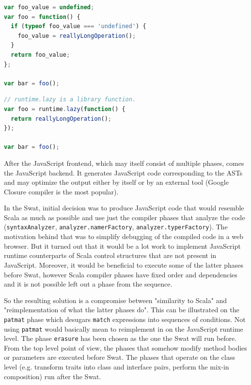 \documentclass[12pt,a4paper]{report}
\begin{document}
\begin{lstlisting}[language=JavaScript,frame=single,caption={Compile-time option outcome.},label={lst:JsCompileTime}]
var foo_value = undefined;
var foo = function() {
  if (typeof foo_value === 'undefined') {
    foo_value = reallyLongOperation();
  }
  return foo_value;
};

var bar = foo();
\end{lstlisting}

\begin{lstlisting}[language=JavaScript,frame=single,caption={Runtime option outcome.},label={lst:JsRunTime}]
// runtime.lazy is a library function.
var foo = runtime.lazy(function() {
  return reallyLongOperation();
});

var bar = foo();
\end{lstlisting}

After the JavaScript frontend, which may itself consist of multiple phases, comes the JavaScript backend. It generates JavaScript code corresponding to the ASTs and may optimize the output either by itself or by an external tool (Google Closure compiler\cite{GoogleClosure} is the most popular).

In the Swat, initial decision was to produce JavaScript code that would resemble Scala as much as possible and use just the compiler phases that analyze the code (\texttt{syntaxAnalyzer}, \texttt{analyzer.namerFactory}, \texttt{analyzer.typerFactory}). The motivation behind that was to simplify debugging of the compiled code in a web browser. But it turned out that it would be a lot work to implement JavaScript runtime counterparts of Scala control structures that are not present in JavaScript. Moreover, it would be beneficial to execute some of the latter phases before Swat, however Scala compiler phases have fixed order and dependencies and it is not possible left out a phase from the sequence. 

So the resulting solution is a compromise between "similarity to Scala" and "reimplementation of what the latter phases do". This can be illustrated on the \texttt{patmat} phase which desugars \texttt{match} expressions into sequences of conditions. Not using \texttt{patmat} would basically mean to reimplement in on the JavaScript runtime level. The phase \texttt{erasure} has been chosen as the one the Swat will run before. From the top level point of view, the phases that somehow modify method bodies or parameters are executed before Swat. The phases that operate on the class level (e.g. transform traits into class and interface pairs, perform the mix-in composition) run after the Swat.
\end{document}
